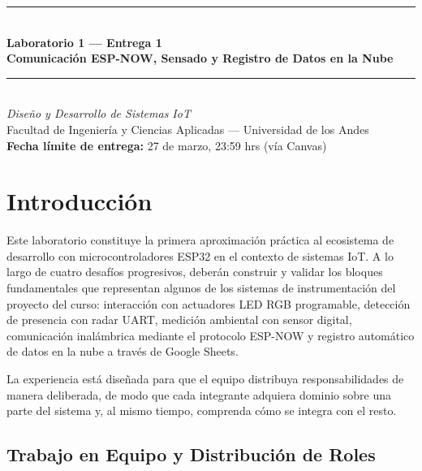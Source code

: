 \documentclass[12pt,leqno]{article}
\begin{document}
\setlength{\parindent}{0.5cm}

\begin{center}
    {\color{azuluandes}\rule{\textwidth}{1.5pt}}\\[0.4cm]
    \textbf{\LARGE Laboratorio 1 --- Entrega 1}\\[0.3cm]
    \textbf{\Large Comunicaci\'on ESP-NOW, Sensado y Registro de Datos en la Nube}\\[0.3cm]
    {\color{azuluandes}\rule{\textwidth}{1.5pt}}\\[0.2cm]
    \textit{Dise\~no y Desarrollo de Sistemas IoT}\\
    Facultad de Ingenier\'ia y Ciencias Aplicadas --- Universidad de los Andes\\[0.3cm]
    \textbf{Fecha l\'imite de entrega:} 27 de marzo, 23:59 hrs (v\'ia Canvas)\\[0.3cm]
\end{center}

\section{Introducci\'on}

Este laboratorio constituye la primera aproximaci\'on pr\'actica al ecosistema de
desarrollo con microcontroladores ESP32 en el contexto de sistemas IoT. A lo largo
de cuatro desaf\'ios progresivos, deber\'an construir y validar los bloques
fundamentales que representan algunos de los sistemas de instrumentaci\'on del
proyecto del curso: interacci\'on con actuadores LED RGB programable, detecci\'on
de presencia con radar UART, medici\'on ambiental con sensor digital, comunicaci\'on
inal\'ambrica mediante el protocolo ESP-NOW y registro autom\'atico de datos en la
nube a trav\'es de Google Sheets.

La experiencia est\'a dise\~nada para que el equipo distribuya responsabilidades de
manera deliberada, de modo que cada integrante adquiera dominio sobre una parte del
sistema y, al mismo tiempo, comprenda c\'omo se integra con el resto.

\newpage
\subsection{Trabajo en Equipo y Distribuci\'on de Roles}
\end{document}
